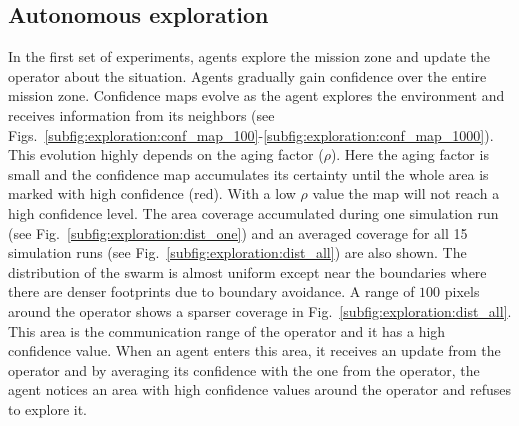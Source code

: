 \documentclass[runningheads]{llncs}%
\begin{document}
\subsection{Autonomous exploration}
In the first set of experiments, agents explore the mission zone and update the operator about the situation. Agents gradually gain confidence over the entire mission zone. Confidence maps evolve as the agent explores the environment and receives information from its neighbors (see Figs.~\ref{subfig:exploration:conf_map_100}-\ref{subfig:exploration:conf_map_1000}). This evolution highly depends on the aging factor ($\rho$). Here the aging factor is small and the confidence map accumulates its certainty until the whole area is marked with high confidence (red). With a low $\rho$ value the map will not reach a high confidence level. The area coverage accumulated during one simulation run (see Fig.~\ref{subfig:exploration:dist_one}) and an averaged coverage for all 15 simulation runs (see Fig.~\ref{subfig:exploration:dist_all}) are also shown. The distribution of the swarm is almost uniform except near the boundaries where there are denser footprints due to boundary avoidance. A range of $100$ pixels around the operator shows a sparser coverage in Fig.~\ref{subfig:exploration:dist_all}. This area is the communication range of the operator and it has a high confidence value. When an agent enters this area, it receives an update from the operator and by averaging its confidence with the one from the operator, the agent notices an area with high confidence values around the operator and refuses to explore it.
\end{document}
